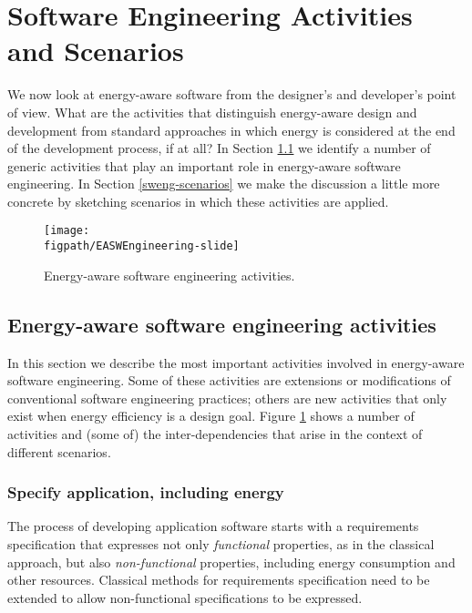 \documentclass[oneside]{book}
\begin{document}
\section{Software Engineering Activities and Scenarios}
\label{ea-sw-eng}


We now look at energy-aware software from the designer's and developer's point of view.
What are the activities that distinguish energy-aware design and development from
standard approaches in which energy is considered at the end of the development process, if at all?
In Section \ref{sweng-activities} we identify a number of generic activities that play an
important role in energy-aware software engineering.  In Section \ref{sweng-scenarios} we make the discussion
a little more concrete by sketching scenarios in which these activities are applied.
\begin{figure}
\centerline{\texttt{[image: \\figpath/EASWEngineering-slide]}}
\vspace{-1.5cm}
\caption{Energy-aware software engineering activities.}
\label{fig:EASWEngineering}
\end{figure}


\subsection{Energy-aware software engineering activities}\label{sweng-activities}

In this section we describe the most important activities involved in
energy-aware software engineering.  Some of these activities are
extensions or modifications of conventional software engineering
practices; others are new activities that only exist when energy
efficiency is a design goal.  Figure \ref{fig:EASWEngineering} shows a
number of activities and (some of) the inter-dependencies that arise
in the context of different scenarios.

\subsubsection{Specify application, including energy}
The process of developing application software starts with a
requirements specification that expresses not only \emph{functional} properties, as
in the classical approach, but also \emph{non-functional} properties,
including energy consumption and other resources.  Classical
methods for requirements specification need to be extended to allow
non-functional specifications to be expressed. 
\end{document}
